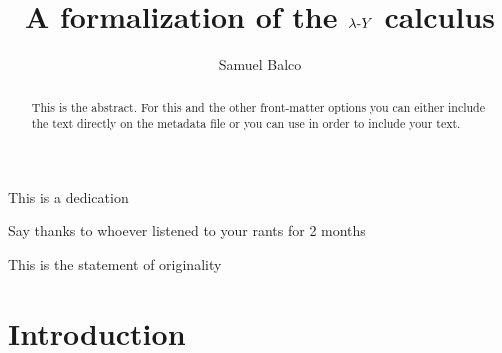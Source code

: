 \documentclass[a4paper, 12pt, twoside]{style/ociamthesis}
\title{A formalization of the \(\lambda\text{-}Y\) calculus}            %
\author{Samuel Balco}          %
\begin{document}
\maketitle

\begin{dedication}
This is a dedication
\end{dedication}

\begin{acknowledgements}
Say thanks to whoever listened to your rants for 2 months
\end{acknowledgements}


\begin{originality}
This is the statement of originality
\end{originality}


\begin{abstract}
This is the abstract. For this and the other front-matter options you
can either include the text directly on the metadata file or you can use
in order to include your text.
\end{abstract}



 \hypersetup{linkcolor=black} 
\setcounter{page}{1}
\setcounter{tocdepth}{2}
\tableofcontents 
\newpage

\chapter{Introduction}\label{introduction}
\end{document}
